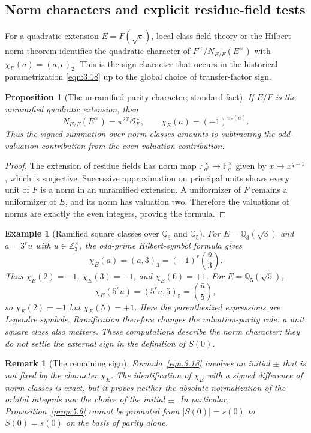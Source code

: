 \documentclass[12pt,letterpaper]{amsart}
\numberwithin{equation}{section}
\newtheorem{proposition}[theorem]{Proposition}
\newtheorem{example}[theorem]{Example}
\newtheorem{draftremark}{Remark}
\theoremstyle{definition}
\theoremstyle{plain}
\begin{document}
\subsection{Norm characters and explicit residue-field tests}
For a quadratic extension $E=F(\sqrt\epsilon)$, local class field
theory or the Hilbert norm theorem identifies the quadratic character
of $F^\times/N_{E/F}(E^\times)$ with
$\chi_E(a)=(a,\epsilon)_2$. This is the sign character that
occurs in the historical parametrization \eqref{eqn:3.18} up to the
global choice of transfer-factor sign.

\begin{proposition}[The unramified parity character; standard fact]
\label{prop:new-unram-char}
If $E/F$ is the unramified quadratic extension, then
\[
 N_{E/F}(E^\times)=\pi^{2\mathbb Z}\mathcal O_F^\times,
 \qquad \chi_E(a)=(-1)^{v_F(a)}.
\]
Thus the signed summation over norm classes amounts to subtracting
the odd-valuation contribution from the even-valuation contribution.
\end{proposition}
\begin{proof}
The extension of residue fields has norm map
$\mathbb F_{q^2}^\times\to\mathbb F_q^\times$ given by
$x\mapsto x^{q+1}$, which is surjective. Successive approximation
on principal units shows every unit of $F$ is a norm in an
unramified extension. A uniformizer of $F$ remains a uniformizer of
$E$, and its norm has valuation two. Therefore the valuations of
norms are exactly the even integers, proving the formula.
\end{proof}

\begin{example}[Ramified square classes over $\mathbb Q_3$ and
$\mathbb Q_5$]
For $E=\mathbb Q_3(\sqrt3)$ and $a=3^r u$ with
$u\in\mathbb Z_3^\times$, the odd-prime Hilbert-symbol formula gives
\[
 \chi_E(a)=(a,3)_3=(-1)^r\left(\frac{\bar u}{3}\right).
\]
Thus $\chi_E(2)=-1$, $\chi_E(3)=-1$, and
$\chi_E(6)=+1$. For $E=\mathbb Q_5(\sqrt5)$,
\[
 \chi_E(5^r u)=(5^r u,5)_5=\left(\frac{\bar u}{5}\right),
\]
so $\chi_E(2)=-1$ but $\chi_E(5)=+1$.
Here the parenthesized expressions are Legendre symbols.
Ramification therefore changes the valuation-parity rule: a unit
square class also matters. These computations describe the norm
character; they do not settle the external sign in the definition
of $S(0)$.
\end{example}

\begin{draftremark}[The remaining sign]
Formula~\eqref{eqn:3.18} involves an initial $\pm$ that is not
fixed by the character $\chi_E$. The identification of
$\chi_E$ with a signed difference of norm classes is exact, but
it proves neither the absolute normalization of the orbital
integrals nor the choice of the initial $\pm$. In particular,
Proposition~\ref{prop:5.6} cannot be promoted from
$|S(0)|=s(0)$ to $S(0)=s(0)$ on the basis of parity alone.
\end{draftremark}
\end{document}
